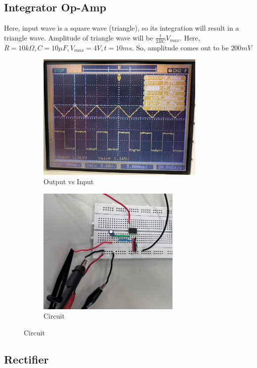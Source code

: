 \documentclass[a4paper,12pt]{article}
\begin{document}
\subsection*{Integrator Op-Amp}
Here, input wave is a square wave (triangle), so its integration will result in a triangle wave. Amplitude of triangle wave will be $\frac{t}{2RC}V_{max}$. \newline Here, $R = 10k\Omega, C = 10\mu F, V_{max} = 4V, t = 10 ms$. So, amplitude comes out to be $200mV$
\begin{figure}[!h]
	\begin{subfigure}[b]{100pt}
		\caption{Output vs Input}
		\includegraphics[width = 230pt]{figs/int1.png}
	\end{subfigure}
	\hspace{110pt}
	\begin{subfigure}[b]{100pt}
		\caption{Circuit}
		\includegraphics[width = 196pt]{figs/int2.png}
	\end{subfigure}
\end{figure}
\subsection*{Rectifier}
\end{document}
